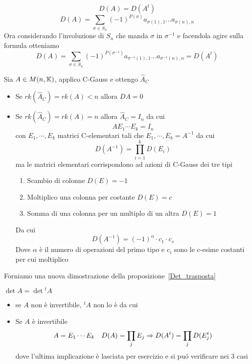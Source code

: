 \spazio
\begin{prop}\label{Det_trasposta}
$$ D (A) = D(A^t )$$
\proof
$$ D(A)= \sum_{\sigma \in S_n } (-1)^{P(\sigma)} a_{\sigma(1),1}\dots a_{\sigma(n), n } $$
Ora considerando l'involuzione di $S_n$ che manda $\sigma $ in $\sigma^{-1}$ e facendola agire sulla formula otteniamo
$$ D(A)= \sum_{\sigma \in S_n } (-1)^{P(\sigma^{-1})} a_{\sigma^{-1}(1),1}\dots a_{\sigma^{-1}(n), n }=D(A^t)$$
\endproof
\end{prop}
\newpage
\begin{prop}\bianco
Sia $A \in M (n ,\mathbb{K}) $, applico C-Gauss e ottengo $\hat{A}_C$
\begin{itemize}
\item Se $rk\left( \hat{A}_C \right) =rk(A) < n $ allora $D A =0 $
\item Se $rk\left( \hat{A}_C \right) =rk(A) =n	 $ allora $\hat{A}_C=I_n$  da cui
$$ A E_1 \cdots E_k=I_n $$ 
con $E_1, \cdots , E_k$ matrici C-elementari tali che $ E_1, \cdots , E_k=A^{-1} $ da cui
$$D\left( A^{-1}\right) = \prod_{i=1}^k D( E_i) $$
ma le matrici elementari corrispondono ad azioni di C-Gauss dei tre tipi
\begin{enumerate}
\item Scambio di colonne $D(E)=-1$
\item Moltiplico una colonna per costante $D( E)=c$
\item Somma di una colonna per un multiplo di un altra
$ D(E)= 1$
\end{enumerate}
Da cui $$D\left( A^{-1} \right)= (-1)^\alpha \cdot c_1 \cdot c_s$$
Dove $\alpha$ \`e il numero di operazioni del primo tipo e $c_i$ sono le c-esime costanti per cui moltiplico 
\end{itemize}
\end{prop}

\spazio 
Forniamo una nuova dimostrazione della proposizione~\ref{Det_trasposta}
\begin{cor} $\det A = \det {}^t A $
\proof \bbianco
\begin{itemize}
\item se $A$ non \`e invertibile, ${}^tA$ non lo \`e da cui 
\item Se $A$ \`e invertibile 
$$A=E_1\cdots E_k \quad D ( A)=\prod_j E_j  \Rightarrow D(A^t)= \prod_j D(E_j^t) $$
dove l'ultima implicazione \`e lasciata per esercizio e si pu\'o verificare nei 3 casi
\end{itemize}
\endproof
\end{cor}
\newpage

